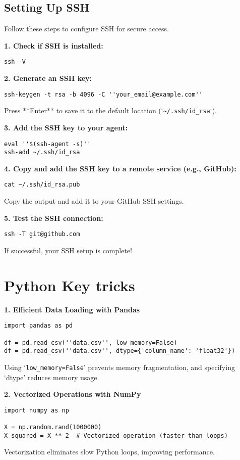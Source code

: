 \subsection{Setting Up SSH}

Follow these steps to configure SSH for secure access.

\textbf{1. Check if SSH is installed:}
\begin{lstlisting}
ssh -V
\end{lstlisting}

\textbf{2. Generate an SSH key:}
\begin{lstlisting}
ssh-keygen -t rsa -b 4096 -C ''your_email@example.com''
\end{lstlisting}

Press **Enter** to save it to the default location (`\verb|~/.ssh/id_rsa|`).

\textbf{3. Add the SSH key to your agent:}
\begin{lstlisting}
eval ''$(ssh-agent -s)''
ssh-add ~/.ssh/id_rsa
\end{lstlisting}

\textbf{4. Copy and add the SSH key to a remote service (e.g., GitHub):}
\begin{lstlisting}
cat ~/.ssh/id_rsa.pub
\end{lstlisting}

Copy the output and add it to your GitHub SSH settings.

\textbf{5. Test the SSH connection:}
\begin{lstlisting}
ssh -T git@github.com
\end{lstlisting}

If successful, your SSH setup is complete!

\section{Python Key tricks}

\textbf{1. Efficient Data Loading with Pandas}
\begin{verbatim}
import pandas as pd

df = pd.read_csv(''data.csv'', low_memory=False)
df = pd.read_csv(''data.csv'', dtype={'column_name': 'float32'})
\end{verbatim}
Using `\verb|low_memory=False|' prevents memory fragmentation, and specifying `dtype' reduces memory usage.

\textbf{2. Vectorized Operations with NumPy}
\begin{verbatim}
import numpy as np

X = np.random.rand(1000000)
X_squared = X ** 2  # Vectorized operation (faster than loops)
\end{verbatim}
Vectorization eliminates slow Python loops, improving performance.

